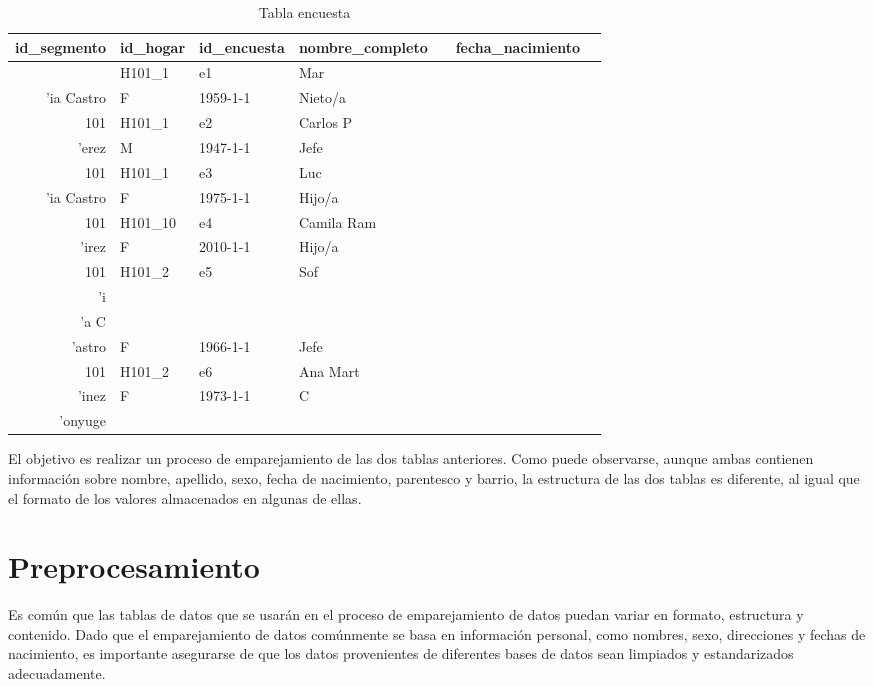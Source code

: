 \documentclass[
  12pt,
]{book}
\begin{document}
\begin{table}[t]
\caption*{
{\fontsize{20}{25}\selectfont  Tabla encuesta\fontsize{12}{15}\selectfont }
} 
\fontsize{12.0pt}{14.0pt}\selectfont
\begin{tabular*}{\linewidth}{@{\extracolsep{\fill}}rllllrl}
\toprule
id\_segmento & id\_hogar & id\_encuesta & nombre\_completo & {\bfseries \cellcolor[HTML]{F9F9F9}{sexo}} & fecha\_nacimiento & {\bfseries \cellcolor[HTML]{F9F9F9}{parentesco}} \\ 
\midrule\addlinespace[2.5pt]
101 & H101\_1 & e1 & Mar\\'ia Castro & F & 1959-1-1 & Nieto/a \\ 
101 & H101\_1 & e2 & Carlos P\\'erez & M & 1947-1-1 & Jefe \\ 
101 & H101\_1 & e3 & Luc\\'ia Castro & F & 1975-1-1 & Hijo/a \\ 
101 & H101\_10 & e4 & Camila Ram\\'irez & F & 2010-1-1 & Hijo/a \\ 
101 & H101\_2 & e5 & Sof\\'i\\'a C\\'astro & F & 1966-1-1 & Jefe \\ 
101 & H101\_2 & e6 & Ana Mart\\'inez & F & 1973-1-1 & C\\'onyuge \\ 
\bottomrule
\end{tabular*}
\end{table}

El objetivo es realizar un proceso de emparejamiento de las dos tablas anteriores. Como puede observarse, aunque ambas contienen información sobre nombre, apellido, sexo, fecha de nacimiento, parentesco y barrio, la estructura de las dos tablas es diferente, al igual que el formato de los valores almacenados en algunas de ellas.

\section{Preprocesamiento}\label{preprocesamiento}

Es común que las tablas de datos que se usarán en el proceso de emparejamiento de datos puedan variar en formato, estructura y contenido. Dado que el emparejamiento de datos comúnmente se basa en información personal, como nombres, sexo, direcciones y fechas de nacimiento, es importante asegurarse de que los datos provenientes de diferentes bases de datos sean limpiados y estandarizados adecuadamente.
\end{document}
